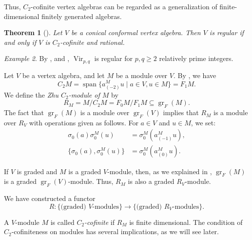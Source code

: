 \documentclass[a4paper, 12pt, reqno]{amsart}
\newtheorem{theorem}{Theorem}[section]
\theoremstyle{remark}
\newtheorem{example}[theorem]{Example}
\DeclareMathOperator{\Vir}{Vir}
\DeclareMathOperator{\gr}{gr}
\DeclareMathOperator{\vspan}{span}
\begin{document}
Thus, $C_2$-cofinite vertex algebras can be regarded as a generalization of finite-dimensional finitely generated algebras.

\begin{theorem}[{\cite[Theorem 4.5]{abe_rationality_2003}}]
  \label{thr:58}
  Let $V$ be a conical conformal vertex algebra.
  Then $V$ is regular if and only if $V$ is $C_2$-cofinite and rational.
\end{theorem}

\begin{example}
  \label{exa:20}
  By ,  and , $\Vir_{p, q}$ is regular for $p, q \ge 2$ relatively prime integers.
\end{example}

Let $V$ be a vertex algebra, and let $M$ be a module over $V$.
By , we have
\begin{equation*}
  C_2M = \vspan\{a^M_{(-2)}u \mid a \in V, u \in M\} = F_1M.
\end{equation*}
We define the \emph{Zhu $C_2$-module of $M$} by
\begin{equation*}
  R_M = M/C_2M = F_0M/F_1M \subseteq \gr_F(M).
\end{equation*}
The fact that $\gr_F(M)$ is a module over $\gr_F(V)$ implies that $R_M$ is a module over $R_V$ with operations given as follows.
For $a \in V$ and $u \in M$, we set:
\begin{align*}
  \sigma_0(a)\sigma^M_0(u) &= \sigma^M_0(a^M_{(-1)}u), \\
  \{\sigma_0(a), \sigma^M_0(u)\} &= \sigma^M_0(a^M_{(0)}u).
\end{align*}

If $V$ is graded and $M$ is a graded $V$-module, then, as we explained in , $\gr_F(M)$ is a graded $\gr_F(V)$-module.
Thus, $R_M$ is also a graded $R_V$-module.

We have constructed a functor
\begin{equation*}
  R: \{\text{(graded) $V$-modules}\} \to \{\text{(graded) $R_V$-modules}\}.
\end{equation*}

A $V$-module $M$ is called \emph{$C_2$-cofinite} if $R_M$ is finite dimensional.
The condition of $C_2$-cofiniteness on modules has several implications, as we will see later.
\end{document}
